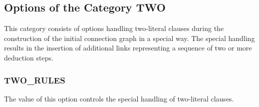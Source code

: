 \subsection{Options of the Category TWO}

This category consists of options handling two-literal clauses during the 
construction of the initial connection graph in a special way. The special 
handling results in the insertion of additional links representing a 
sequence of two or more deduction steps. 

\subsubsection{TWO\_RULES}
  

The value of this option controls the special handling of two-literal
clauses. 

